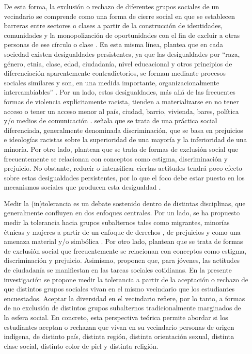 \documentclass[12pt,twoside]{templates/facsothesis}
\begin{document}
De esta forma, la exclusión o rechazo de diferentes grupos sociales de un vecindario se comprende como una forma de cierre social en que se establecen barreras entre sectores o clases a partir de la construcción de identidades, comunidades y la monopolización de oportunidades con el fin de excluir a otras personas de ese círculo o clase \citep{parkin_Marxismo_1984}. En esta misma línea, \citet{tilly_desigualdad_2000} plantea que en cada sociedad existen desigualdades persistentes, ya que las desigualdades por ``raza, género, etnia, clase, edad, ciudadanía, nivel educacional y otros principios de diferenciación aparentemente contradictorios, se forman mediante procesos sociales similares y son, en una medida importante, organizacionalmente intercambiables'' \citep[p.~23]{tilly_desigualdad_2000}. Por un lado, estas desigualdades, más allá de las frecuentes formas de violencia explícitamente racista, tienden a materializarse en no tener acceso o tener un acceso menor al país, ciudad, barrio, vivienda, bares, política y/o medios de comunicación \citep{vandijk_Racismo_2013}. \citet{vandijk_Racismo_2013} señala que se trata de una práctica social diferenciada, generalmente denominada discriminación, que se basa en prejuicios e ideologías racistas sobre la superioridad de una mayoría y la inferioridad de una minoría. Por otro lado, \citet{diez-nicolas_Exclusion_2019} plantean que se trata de formas de exclusión social que frecuentemente se relacionan con conceptos como estigma, discriminación y prejuicio. No obstante, reducir o intensificar ciertas actitudes tendrá poco efecto sobre estas desigualdades persistentes, por lo que el foco debe estar puesto en los mecanismos sociales que producen esta desigualdad \citep{tilly_desigualdad_2000}.

Medir la (in)tolerancia es un debate sostenido dentro de distintas disciplinas, que generalmente confluyen en dos enfoques centrales. Por un lado, se ha propuesto medir la tolerancia hacia grupos subalternos tales como migrantes, minorías étnicas y mujeres a partir de un enfoque de derechos \citep{miranda_Political_2018, trevino_Influence_2018}, de prejuicios \citep{meeusen_ParentChild_2015, weber_educational_2020} y como una amenaza material y/o simbólica \citep{raijman_Perceived_2004}. Por otro lado, \citet{diez-nicolas_Exclusion_2019} plantean que se trata de formas de exclusión social que frecuentemente se relacionan con conceptos como estigma, discriminación y prejuicio. Asimismo, \citet{tendam_Measuring_2011} proponen que, para jóvenes, las actitudes de ciudadanía se manifiestan en las tareas sociales cotidianas. En la presente investigación se propone medir la tolerancia a partir de la aceptación o rechazo de que distintos grupos sociales vivan en el mismo vecindario que los estudiantes encuestados. Aceptar la diversidad en el vecindario refiere, por lo tanto, a formas de no exclusión de distintos grupos subalternos tradicionalmente marginados de la esfera social. En concreto, esta perspectiva teórica permite abordar si los estudiantes aceptan o rechazan que vivan en su vecindario personas de origen indígena, de distinto país, distinta región, distinta orientación sexual, distinta clase social, distinto color de piel y distinta religión.
\end{document}
